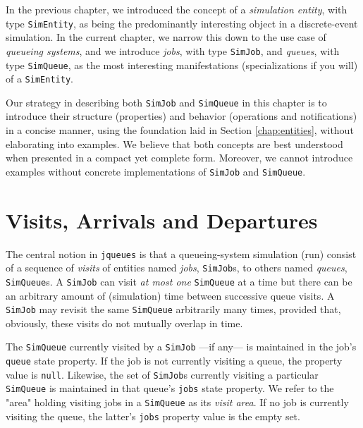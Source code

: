 In the previous chapter,
  we introduced the concept
  of a {\em simulation entity\/},
  with type \lstinline|SimEntity|,
  as being the predominantly interesting object
  in a discrete-event simulation.
In the current chapter,
  we narrow this down to 
  the use case of {\em queueing systems},
  and we introduce {\em jobs},
  with type \lstinline|SimJob|,
  and {\em queues},
  with type \lstinline|SimQueue|,
  as the most interesting manifestations
  (specializations if you will) of
  a \lstinline|SimEntity|.

Our strategy in describing both
  \lstinline|SimJob| and \lstinline|SimQueue|
  in this chapter
  is to introduce their structure
  (properties) and behavior (operations and notifications)
  in a concise manner,
  using the foundation laid in Section \ref{chap:entities},
  without elaborating into examples.
We believe that both concepts are best understood
  when presented in a compact yet complete form.
Moreover,
  we cannot introduce examples without
  concrete implementations of
  \lstinline|SimJob| and \lstinline|SimQueue|.
    
\section{Visits, Arrivals and Departures}

The central notion in \lstinline|jqueues|
  is that a queueing-system simulation (run)
  consist of a sequence of {\em visits\/}
  of entities named {\em jobs},
  \lstinline|SimJob|s,
  to others named {\em queues},
  \lstinline|SimQueue|s.
A \lstinline|SimJob| can visit
  {\em at most one\/}
  \lstinline|SimQueue|
  at a time
  but there can be an arbitrary amount of
  (simulation) time
  between successive queue visits.
A \lstinline|SimJob|
  may revisit the same \lstinline|SimQueue|
  arbitrarily many times,
  provided that, obviously,
  these visits do not mutually overlap
  in time.
  
The \lstinline|SimQueue| currently visited by a \lstinline|SimJob|
  ---if any---
  is maintained in the job's
  \lstinline|queue| state property.
If the job is not currently visiting
  a queue,
  the property value is \lstinline|null|.
Likewise,
  the set of \lstinline|SimJob|s currently
  visiting a particular \lstinline|SimQueue|
  is maintained in that queue's
  \lstinline|jobs| state property.
We refer to the "area" holding visiting jobs
  in a \lstinline|SimQueue| as its {\em visit area}.
If no job is currently visiting the queue,
  the latter's \lstinline|jobs| property
  value is the empty set.
  
